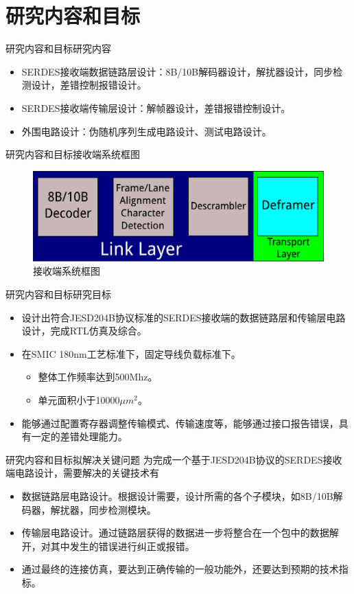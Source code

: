 \documentclass{beamer}
\begin{document}
\section{研究内容和目标}

\begin{frame}{研究内容和目标}{研究内容}
	\begin{itemize}
	\item SERDES接收端数据链路层设计：8B/10B解码器设计，解扰器设计，同步检测设计，差错控制报错设计。
	\item SERDES接收端传输层设计：解帧器设计，差错报错控制设计。
	\item 外围电路设计：伪随机序列生成电路设计、测试电路设计。
	\end{itemize}
\end{frame}

\begin{frame}{研究内容和目标}{接收端系统框图}
	\begin{figure}
	\centering
	\includegraphics[scale=0.6]{serdes_sturct_link_transport_layer.pdf}
	\caption{接收端系统框图}
	\end{figure}
\end{frame}

\begin{frame}{研究内容和目标}{研究目标}
	\begin{itemize}
	\item 设计出符合JESD204B协议标准的SERDES接收端的数据链路层和传输层电路设计，完成RTL仿真及综合。
	\item 在SMIC 180nm工艺标准下，固定导线负载标准下。
		\begin{itemize}
		\item 整体工作频率达到500Mhz。
		\item 单元面积小于10000$\mu m^2$。
		\end{itemize}
	\item 能够通过配置寄存器调整传输模式、传输速度等，能够通过接口报告错误，具有一定的差错处理能力。
	\end{itemize}
\end{frame}

\begin{frame}{研究内容和目标}{拟解决关键问题}
为完成一个基于JESD204B协议的SERDES接收端电路设计，需要解决的关键技术有
	\begin{itemize}
	\item 数据链路层电路设计。根据设计需要，设计所需的各个子模块，如8B/10B解码器，解扰器，同步检测模块。
	\item 传输层电路设计。通过链路层获得的数据进一步将整合在一个包中的数据解开，对其中发生的错误进行纠正或报错。
	\item 通过最终的连接仿真，要达到正确传输的一般功能外，还要达到预期的技术指标。
	\end{itemize}
\end{frame}
\end{document}
